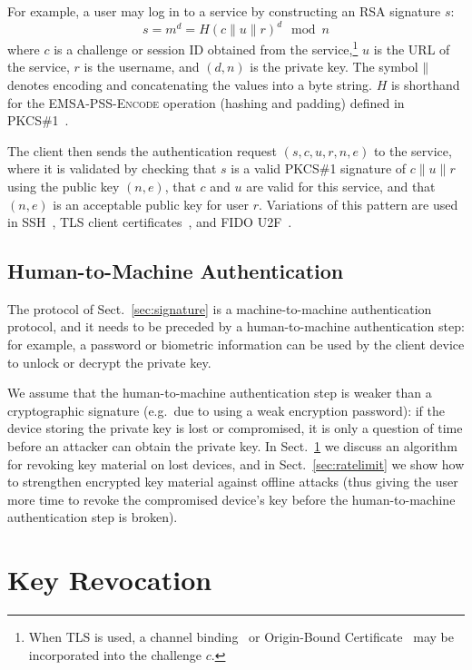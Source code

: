 \documentclass{llncs}
\newcommand*{\concat}{\mathbin{\|}}
\begin{document}
For example, a user may log in to a service by constructing an RSA signature $s$:
\begin{equation}
s = m^d = H(c \concat u \concat r)^d \mod n
\end{equation}
where $c$ is a challenge or session ID obtained from the service,\footnote{When TLS is used, a
channel binding~\cite{ChannelBinding} or Origin-Bound Certificate~\cite{Dietz12} may be incorporated
into the challenge $c$.} $u$ is the URL of the service, $r$ is the username, and $(d, n)$ is the
private key. The symbol $\concat$ denotes encoding and concatenating the values into a byte string.
$H$ is shorthand for the \textsc{EMSA-PSS-Encode} operation (hashing and padding) defined in
PKCS\#1~\cite{PKCS1}.

The client then sends the authentication request $(s, c, u, r, n, e)$ to the service, where it is
validated by checking that $s$ is a valid PKCS\#1 signature of $c \concat u \concat r$ using the
public key $(n, e)$, that $c$ and $u$ are valid for this service, and that $(n, e)$ is an acceptable
public key for user $r$. Variations of this pattern are used in SSH~\cite{SSH}, TLS client
certificates~\cite{TLS}, and FIDO U2F~\cite{FIDOOverview}.

\subsection{Human-to-Machine Authentication}\label{sec:human-to-machine}

The protocol of Sect.~\ref{sec:signature} is a machine-to-machine authentication protocol, and it
needs to be preceded by a human-to-machine authentication step: for example, a password or biometric
information can be used by the client device to unlock or decrypt the private key.

We assume that the human-to-machine authentication step is weaker than a cryptographic signature
(e.g.\ due to using a weak encryption password): if the device storing the private key is lost or
compromised, it is only a question of time before an attacker can obtain the private key. In
Sect.~\ref{sec:revocation} we discuss an algorithm for revoking key material on lost devices, and in
Sect.~\ref{sec:ratelimit} we show how to strengthen encrypted key material against offline attacks
(thus giving the user more time to revoke the compromised device's key before the human-to-machine
authentication step is broken).

\section{Key Revocation}\label{sec:revocation}
\end{document}
